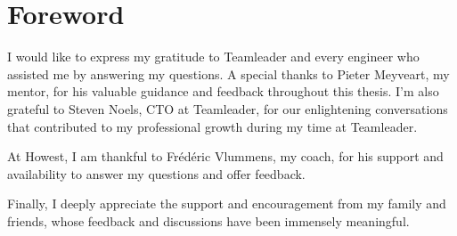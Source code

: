 \newpage
\thispagestyle{empty}

\section*{Foreword}

I would like to express my gratitude to Teamleader and every engineer who assisted me by answering my questions. A special thanks to Pieter Meyveart, my mentor, for his valuable guidance and feedback throughout this thesis. I'm also grateful to Steven Noels, CTO at Teamleader, for our enlightening conversations that contributed to my professional growth during my time at Teamleader.

At Howest, I am thankful to Frédéric Vlummens, my coach, for his support and availability to answer my questions and offer feedback.

Finally, I deeply appreciate the support and encouragement from my family and friends, whose feedback and discussions have been immensely meaningful. 
